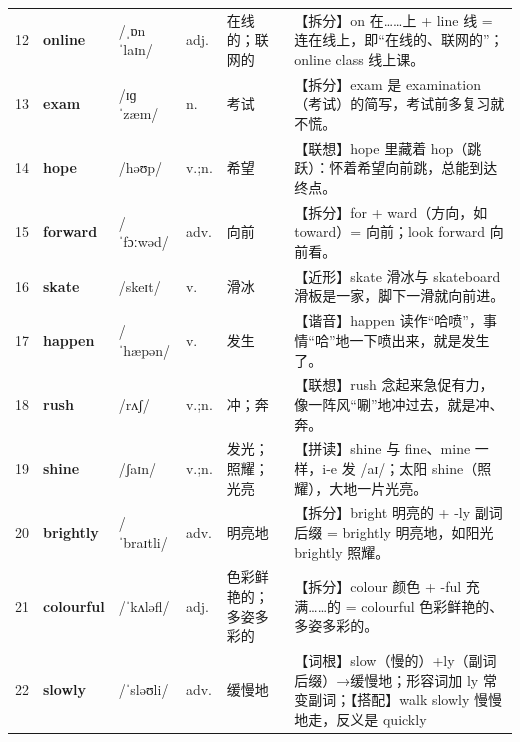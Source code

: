 \documentclass[UTF8,a4paper,11pt,oneside]{ctexbook}
\newcommand{\cellword}[1]{{\bfseries\textcolor{wordcol}{#1}}}
\newcommand{\cellipa}[1]{{\footnotesize\textcolor{ipacol}{#1}}}
\newcommand{\cellpos}[1]{\textcolor{poscol}{#1}}
\newcommand{\cellno}[1]{\textcolor{volcolor!75!black}{#1}}
\begin{document}
{\begin{longtable}{@{}C{0.045\textwidth}L{0.155\textwidth}L{0.175\textwidth}C{0.070\textwidth}L{0.180\textwidth}L{0.282\textwidth}@{}}
\cellno{12} & \cellword{online} & \cellipa{/ˌɒnˈlaɪn/} & \cellpos{adj.} & 在线的；联网的 & \textcolor{tagSplit}{【拆分】}on 在……上 + line 线 = 连在线上，即“在线的、联网的”；online class 线上课。 \\
 \cellno{13} & \cellword{exam} & \cellipa{/ɪɡˈzæm/} & \cellpos{n.} & 考试 & \textcolor{tagSplit}{【拆分】}exam 是 examination（考试）的简写，考试前多复习就不慌。 \\
\cellno{14} & \cellword{hope} & \cellipa{/həʊp/} & \cellpos{v.;\allowbreak{}n.} & 希望 & \textcolor{tagAssoc}{【联想】}hope 里藏着 hop（跳跃）：怀着希望向前跳，总能到达终点。 \\
 \cellno{15} & \cellword{forward} & \cellipa{/ˈfɔːwəd/} & \cellpos{adv.} & 向前 & \textcolor{tagSplit}{【拆分】}for + ward（方向，如 toward）= 向前；look forward 向前看。 \\
\cellno{16} & \cellword{skate} & \cellipa{/skeɪt/} & \cellpos{v.} & 滑冰 & \textcolor{tagNear}{【近形】}skate 滑冰与 skateboard 滑板是一家，脚下一滑就向前进。 \\
 \cellno{17} & \cellword{happen} & \cellipa{/ˈhæpən/} & \cellpos{v.} & 发生 & \textcolor{tagSound}{【谐音】}happen 读作“哈喷”，事情“哈”地一下喷出来，就是发生了。 \\
\cellno{18} & \cellword{rush} & \cellipa{/rʌʃ/} & \cellpos{v.;\allowbreak{}n.} & 冲；奔 & \textcolor{tagAssoc}{【联想】}rush 念起来急促有力，像一阵风“唰”地冲过去，就是冲、奔。 \\
 \cellno{19} & \cellword{shine} & \cellipa{/ʃaɪn/} & \cellpos{v.;\allowbreak{}n.} & 发光；照耀；光亮 & \textcolor{tagSpell}{【拼读】}shine 与 fine、mine 一样，i-e 发 /aɪ/；太阳 shine（照耀），大地一片光亮。 \\
\cellno{20} & \cellword{brightly} & \cellipa{/ˈbraɪtli/} & \cellpos{adv.} & 明亮地 & \textcolor{tagSplit}{【拆分】}bright 明亮的 + -ly 副词后缀 = brightly 明亮地，如阳光 brightly 照耀。 \\
 \cellno{21} & \cellword{colourful} & \cellipa{/ˈkʌləfl/} & \cellpos{adj.} & 色彩鲜艳的；多姿多彩的 & \textcolor{tagSplit}{【拆分】}colour 颜色 + -ful 充满……的 = colourful 色彩鲜艳的、多姿多彩的。 \\
\cellno{22} & \cellword{slowly} & \cellipa{/ˈsləʊli/} & \cellpos{adv.} & 缓慢地 & \textcolor{tagRoot}{【词根】}slow（慢的）+ly（副词后缀）→\allowbreak{}缓慢地；形容词加 ly 常变副词；\textcolor{tagColloc}{【搭配】}walk slowly 慢慢地走，反义是 quickly \\

\end{longtable}}
\end{document}

